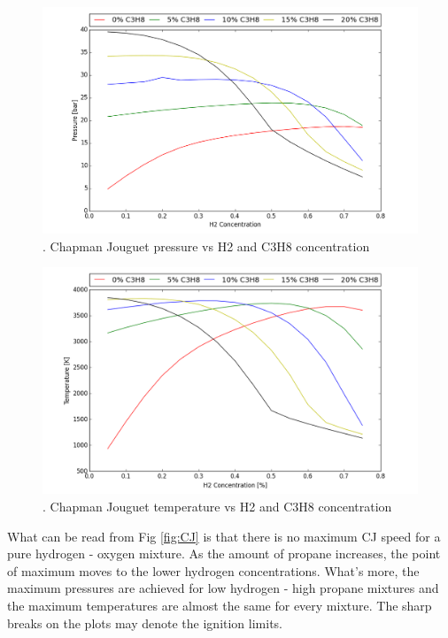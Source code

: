 \documentclass[11pt,a4paper]{article}
\begin{document}
\begin{figure}[t]
    \centering
    \includegraphics[width=1.2\textwidth]{plot_P}
    \caption{.          Chapman Jouguet pressure vs H2 and C3H8 concentration}
    \label{fig:P}
\end{figure}
\clearpage
\begin{figure}[t]
    \centering
    \includegraphics[width=1.2\textwidth]{plot_T}
    \caption{.        Chapman Jouguet temperature vs H2 and C3H8 concentration}
    \label{fig:T}
\end{figure}

What can be read from Fig \ref{fig:CJ} is that there is no maximum CJ speed for a pure hydrogen - oxygen mixture. As the amount of propane increases, the point of maximum moves to the lower hydrogen concentrations. What's more, the maximum pressures are achieved for low hydrogen - high propane mixtures and the maximum temperatures are almost the same for every mixture. The sharp breaks on the plots may denote the ignition limits.
\end{document}
